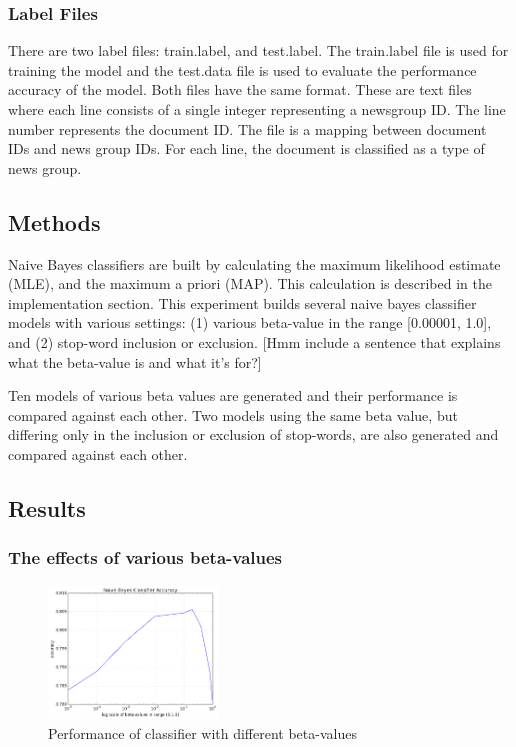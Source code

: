 \documentclass{IEEEtran}
\begin{document}
\subsubsection{Label Files}
There are two label files: train.label, and test.label. The train.label file is used for training the model and the test.data file is used to evaluate the performance accuracy of the model. Both files have the same format. These are text files where each line consists of a single integer representing a newsgroup ID. The line number represents the document ID. The file is a mapping between document IDs and news group IDs. For each line, the document is classified as a type of news group.


\subsection{Methods}
Naive Bayes classifiers are built by calculating the maximum likelihood estimate (MLE), and the maximum a priori (MAP). This calculation is described in the implementation section. This experiment builds several naive bayes classifier models with various settings: (1) various beta-value in the range [0.00001, 1.0], and (2) stop-word inclusion or exclusion. [Hmm include a sentence that explains what the beta-value is and what it's for?]

Ten models of various beta values are generated and their performance is compared against each other. Two models using the same beta value, but differing only in the inclusion or exclusion of stop-words, are also generated and compared against each other.

\subsection{Results}
\subsubsection{The effects of various beta-values}

\begin{figure}
  \includegraphics[width=0.4\textwidth, natwidth=80,natheight=80]{betavsacc.png}
  \caption{Performance of classifier with different beta-values}
  \label{fig:betavsacc}
\end{figure}
\end{document}
